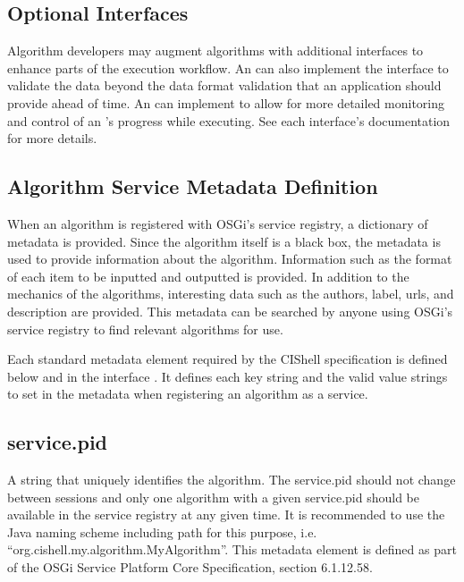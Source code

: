 \subsection{Optional Interfaces}

Algorithm developers may augment algorithms with additional interfaces to enhance
parts of the execution workflow. An  can also implement
the  interface to validate the data beyond the data format
validation that an application should provide ahead of time. An 
can implement  to allow for more detailed monitoring and
control of an 's progress while executing. See each interface's
documentation for more details.

\subsection{Algorithm Service Metadata Definition}
\label{algMetaData}

When an algorithm is registered with OSGi's service registry, a dictionary of
metadata is provided. Since the algorithm itself is a black box, the metadata is
used to provide information about the algorithm. Information such as the format
of each  item to be inputted and outputted is provided. In addition
to the mechanics of the algorithms, interesting data such as the authors, label,
urls, and description are provided. This metadata can be searched by anyone using
OSGi's service registry to find relevant algorithms for use.

Each standard metadata element required by the CIShell specification is defined
below and in the interface . It defines each key string
and the valid value strings to set in the metadata  when
registering an algorithm as a service.

\subsection*{service.pid}
A string that uniquely identifies the algorithm. The service.pid should not
change between sessions and only one algorithm with a given service.pid should
be available in the service registry at any given time. It is recommended to 
use the Java naming scheme including path for this purpose, i.e.
``org.cishell.my.algorithm.MyAlgorithm''. This metadata element is defined
as part of the OSGi Service Platform Core Specification, section 6.1.12.58. 

